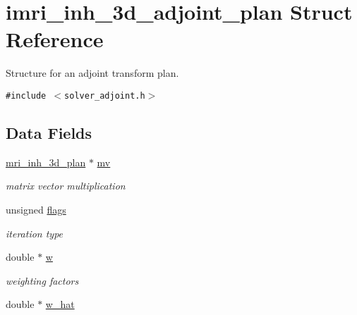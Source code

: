 \hypertarget{structimri__inh__3d__adjoint__plan}{
\section{imri\_\-inh\_\-3d\_\-adjoint\_\-plan Struct Reference}
\label{structimri__inh__3d__adjoint__plan}
}
Structure for an adjoint transform plan.  


{\tt \#include $<$solver\_\-adjoint.h$>$}

\subsection*{Data Fields}
\begin{CompactItemize}
\item 
\hypertarget{structimri__inh__3d__adjoint__plan_fa903e9a436fc17da89b08377a6a733e}{
\hyperlink{structmri__inh__3d__plan}{mri\_\-inh\_\-3d\_\-plan} $\ast$ \hyperlink{structimri__inh__3d__adjoint__plan_fa903e9a436fc17da89b08377a6a733e}{mv}}
\label{structimri__inh__3d__adjoint__plan_fa903e9a436fc17da89b08377a6a733e}

\begin{CompactList}\small\item\em matrix vector multiplication \item\end{CompactList}\item 
\hypertarget{structimri__inh__3d__adjoint__plan_add41183d54818f3e8528affe40769bc}{
unsigned \hyperlink{structimri__inh__3d__adjoint__plan_add41183d54818f3e8528affe40769bc}{flags}}
\label{structimri__inh__3d__adjoint__plan_add41183d54818f3e8528affe40769bc}

\begin{CompactList}\small\item\em iteration type \item\end{CompactList}\item 
\hypertarget{structimri__inh__3d__adjoint__plan_a4cd6ea3040339a39047978a7c1f1c9d}{
double $\ast$ \hyperlink{structimri__inh__3d__adjoint__plan_a4cd6ea3040339a39047978a7c1f1c9d}{w}}
\label{structimri__inh__3d__adjoint__plan_a4cd6ea3040339a39047978a7c1f1c9d}

\begin{CompactList}\small\item\em weighting factors \item\end{CompactList}\item 
\hypertarget{structimri__inh__3d__adjoint__plan_a53e43e9cd65db3ba08ed275cb62d456}{
double $\ast$ \hyperlink{structimri__inh__3d__adjoint__plan_a53e43e9cd65db3ba08ed275cb62d456}{w\_\-hat}}
\label{structimri__inh__3d__adjoint__plan_a53e43e9cd65db3ba08ed275cb62d456}


\end{CompactItemize}
